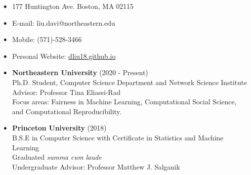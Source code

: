 \documentclass[margin]{res}
\begin{document}
 


\begin{resume} 

 
\begin{itemize}\itemsep -1pt  %
\section{Contact Information}
\item[] 177 Huntington Ave. Boston, MA 02115
\item[] E-mail: liu.davi@northeastern.edu
\item[] Mobile: (571)-528-3466
\item[] Personal Website: \href{https://dliu18.github.io}{dliu18.github.io}
\end{itemize}

\begin{itemize}
\section{Education} 
\item[]
\textbf{Northeastern University} (2020 - Present)\\
Ph.D. Student, Computer Science Department and Network Science Institute\\
Advisor: Professor Tina Eliassi-Rad\\
Focus areas: Fairness in Machine Learning, Computational Social Science, and Computational Reproducibility.

\item[]
\textbf{Princeton University} (2018)\\
B.S.E in Computer Science with Certificate in Statistics and Machine Learning\\
Graduated \emph{summa cum laude}\\
Undergraduate Advisor: Professor Matthew J. Salganik 
\end{itemize}


\end{resume}
\end{document}
